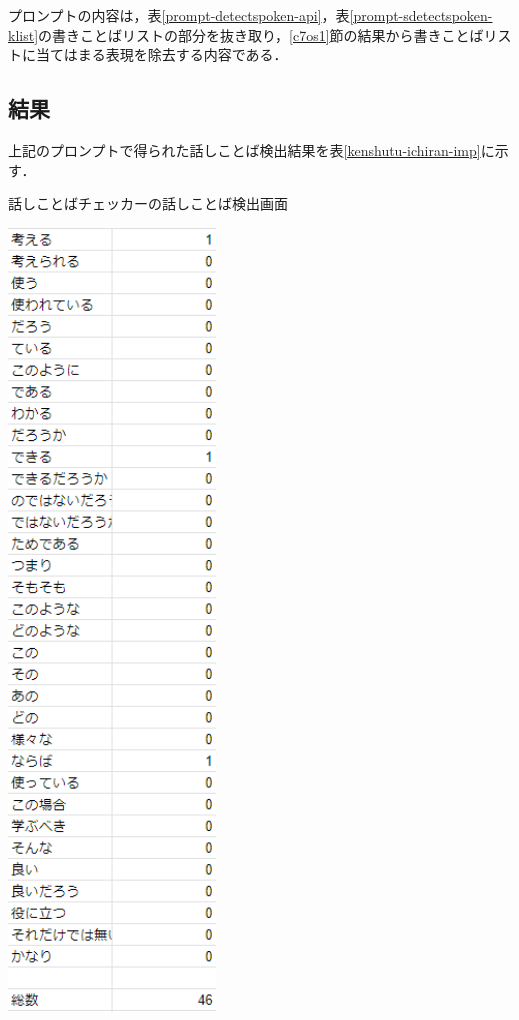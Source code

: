

プロンプトの内容は，表\ref{prompt-detectspoken-api}，表\ref{prompt-sdetectspoken-klist}の書きことばリストの部分を抜き取り，\ref{c7os1}節の結果から書きことばリストに当てはまる表現を除去する内容である．

\subsection{結果}
上記のプロンプトで得られた話しことば検出結果を表\ref{kenshutu-ichiran-imp}に示す．

\begin{table}[H]
	\centering
        \caption{話しことばチェッカーの話しことば検出画面}
 	\includegraphics[width=55mm]{image/kenshutu-ichiran-imp.png}
	\label{kenshutu-ichiran-imp}
\end{table}

